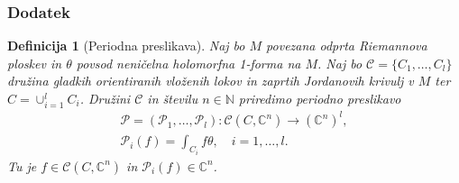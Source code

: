 \documentclass[9pt, table]{beamer}
\newtheorem{definicija}{Definicija}
\newcommand{\N}{\mathbb N}
\newcommand{\C}{\mathbb C}
\begin{document}

\begin{frame}
\frametitle{Dodatek}

\begin{definicija} [Periodna preslikava]
Naj bo $M$ povezana odprta Riemannova ploskev in $\theta$ povsod neničelna holomorfna 1-forma na $M$. Naj bo $\mathcal{C} = \{C_1, \dots , C_{l} \}$ družina gladkih orientiranih vloženih lokov in zaprtih Jordanovih krivulj v $M$ ter $C = \cup_{i=1}^{l} C_{i}$.
Družini $\mathcal{C}$ in številu $n \in \N$ priredimo {\color{blue}periodno preslikavo}
\begin{gather}
\mathcal{P} = (\mathcal{P}_1, \dots , \mathcal{P}_{l}) \colon \mathcal{C}(C, \C^{n}) \to (\C^{n})^{l}, \nonumber \\
\mathcal{P}_{i}(f) = \int_{C_{i}} f \theta, \quad i=1, \dots , l.
\end{gather}
Tu je $f \in \mathcal{C}(C, \C^{n})$ in $\mathcal{P}_{i}(f) \in \C^{n}$.
\end{definicija}

\end{frame}

\end{document}
